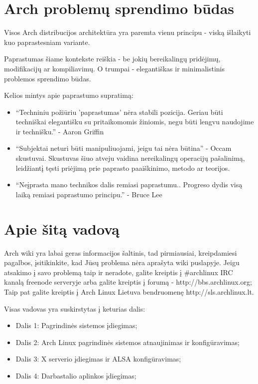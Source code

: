   \section{Arch problemų sprendimo būdas}
  
  Visos Arch distribucijos architektūra yra paremta vienu principu -
  viską išlaikyti kuo paprastesniam variante.

  Paprastumas šiame kontekste reiškia - be jokių bereikalingų
  pridėjimų, modifikacijų ar kompiliavimų. O trumpai - elegantiškas
  ir minimalistinis problemos sprendimo būdas.

  Kelios mintys apie paprastumo supratimą:
  \begin{itemize}
    \item ``Techniniu požiūriu 'paprastumas' nėra stabili
      pozicija. Geriau būti techniškai elegantišku su pritaikomomis
      žiniomis, negu būti lengvu naudojime ir technišku.'' - Aaron
      Griffin
    \item ``Subjektai neturi būti manipuliuojami, jeigu tai nėra
      būtina'' - Occam skustuvai. Skustuvas šiuo atveju vaidina
      nereikalingų operacijų pašalinimą, leidžiantį tęsti priėjimą prie
      paprasto paaiškinimo, metodo ar teorijos.
    \item ``Neįprasta mano technikos dalis remiasi
      paprastumu.. Progreso dydis visą laiką remiasi paprastumo principu.'' - Bruce Lee
  \end{itemize}

  \section{Apie šitą vadovą}

    Arch wiki yra labai geras informacijos šaltinis, tad pirmiausiai,
    kreipdamiesi pagalbos, įsitikinkite, kad Jūsų problema nėra
    aprašyta wiki puslapyje. Jeigu atsakimo į savo problemą taip ir neradote, galite
    kreiptis į $\#$archlinux IRC kanalą freenode serveryje arba galite
    kreiptis į forumą - http://bbs.archlinux.org; Taip pat galite
    kreiptis į Arch Linux Lietuva bendruomenę http://sls.archlinux.lt.

    Visas vadovas yra suskirstytas į keturias dalis:
    \begin{itemize}
      \item Dalis 1: Pagrindinės sistemos įdiegimas;
      \item Dalis 2: Arch Linux pagrindinės sistemos atnaujinimas ir
        konfigūravimas;
      \item Dalis 3: X serverio įdiegimas ir ALSA konfigūravimas;
      \item Dalis 4: Darbastalio aplinkos įdiegimas;
    \end{itemize}